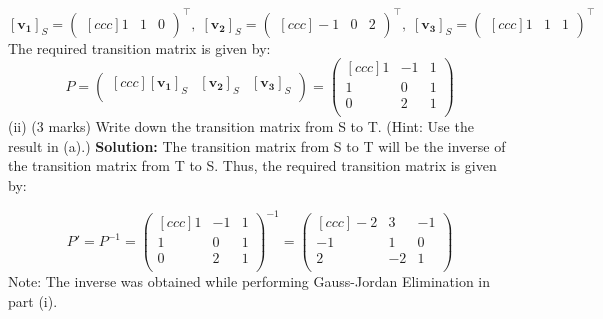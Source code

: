\documentclass{article}
\begin{document}
$$[\bm{v_1}]_S = \begin{pmatrix}[ccc] 1 & 1 & 0 \end{pmatrix}^\top, \; [\bm{v_2}]_S = \begin{pmatrix}[ccc] -1 & 0 & 2 \end{pmatrix}^\top, \; [\bm{v_3}]_S = \begin{pmatrix}[ccc] 1 & 1 & 1 \end{pmatrix}^\top$$
The required transition matrix is given by:
$$P = \begin{pmatrix}[ccc]
    [\bm{v_1}]_S & [\bm{v_2}]_S & [\bm{v_3}]_S \\
\end{pmatrix} = 
\begin{pmatrix}[ccc]
    1 & -1 & 1 \\
    1 & 0 & 1 \\
    0 & 2 & 1 \\
\end{pmatrix}$$
(ii) (3 marks) Write down the transition matrix from S to T. (Hint: Use the result in (a).)
\newline
\textbf{Solution:}
The transition matrix from S to T will be the inverse of the transition matrix from T to S. Thus, the required transition matrix is given by:

$$P' = P ^{-1} =  
\begin{pmatrix}[ccc]
    1 & -1 & 1 \\
    1 & 0 & 1 \\
    0 & 2 & 1 \\
\end{pmatrix}^{-1} = 
\begin{pmatrix}[ccc]
    -2 & 3 & -1 \\
    -1 & 1 & 0 \\
    2 & -2 & 1 \\
\end{pmatrix}$$
Note: The inverse was obtained while performing Gauss-Jordan Elimination in part (i).

\newpage
\end{document}
